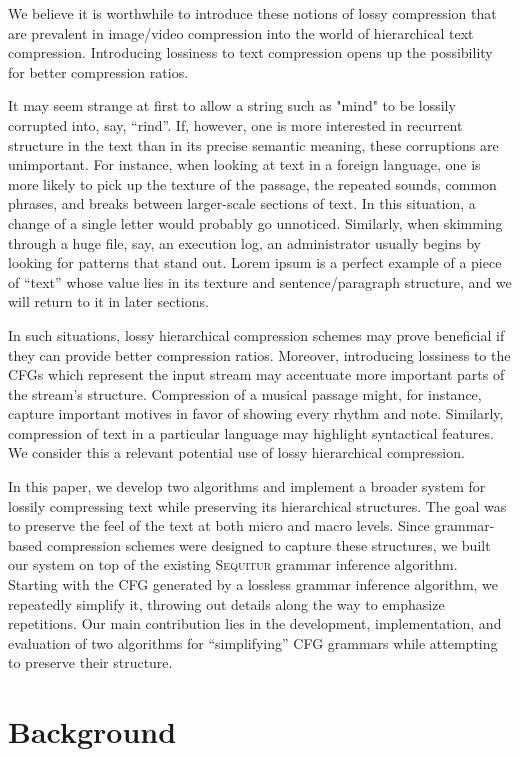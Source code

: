 \documentclass[11pt]{article}
\newcommand{\Sequitur}{\textsc{Sequitur}\xspace}
\begin{document}
We believe it is worthwhile to introduce these notions of lossy compression
that are prevalent in image/video compression into the world of hierarchical
text compression.  Introducing lossiness to text compression opens up the
possibility for better compression ratios.

It may seem strange at first to allow a string such as "mind" to be lossily
corrupted into, say, ``rind''.  If, however, one is more interested in
recurrent structure in the text than in its precise semantic meaning, these
corruptions are unimportant.  For instance, when looking at text in a foreign
language, one is more likely to pick up the texture of the passage, the
repeated sounds, common phrases, and breaks between larger-scale sections of
text.  In this situation, a change of a single letter would probably go
unnoticed.  Similarly, when skimming through a huge file, say, an execution
log, an administrator usually begins by looking for patterns that stand out.
Lorem ipsum is a perfect example of a piece of ``text'' whose value lies in its
texture and sentence/paragraph structure, and we will return to it in later
sections.

In such situations, lossy hierarchical compression schemes may prove beneficial
if they can provide better compression ratios.  Moreover, introducing lossiness
to the CFGs which represent the input stream may accentuate more important
parts of the stream's structure.  Compression of a musical passage might, for
instance, capture important motives in favor of showing every rhythm and note.
Similarly, compression of text in a particular language may highlight
syntactical features.  We consider this a relevant potential use of lossy
hierarchical compression.

In this paper, we develop two algorithms and implement a broader system for
lossily compressing text while preserving its hierarchical structures.  The
goal was to preserve the feel of the text at both micro and macro levels.
Since grammar-based compression schemes were designed to capture these
structures, we built our system on top of the existing \Sequitur grammar
inference algorithm.  Starting with the CFG generated by a lossless grammar
inference algorithm, we repeatedly simplify it, throwing out details along the
way to emphasize repetitions.  Our main contribution lies in the development,
implementation, and evaluation of two algorithms for ``simplifying'' CFG
grammars while attempting to preserve their structure.

\section{Background}
\end{document}
